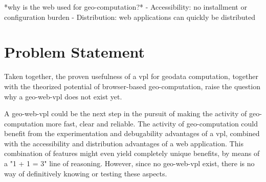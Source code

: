 







*why is the web used for geo-computation?*
- Accessibility: no installment or configuration burden
- Distribution: web applications can quickly be distributed


\section{Problem Statement}
Taken together, the proven usefulness of a vpl for geodata computation, together with the theorized potential of browser-based geo-computation, raise the question why a \ac{geo-web-vpl} does not exist yet.

A \ac{geo-web-vpl} could be the next step in the pursuit of making the activity of geo-computation more fast, clear and reliable.
The activity of geo-computation could benefit from the experimentation and debugability advantages of a \ac{vpl}, combined with the accessibility and distribution advantages of a web application. This combination of features might even yield completely unique benefits, by means of a "1 + 1 = 3" line of reasoning.
However, since no geo-web-vpl exist, there is no way of definitively knowing or testing these aspects. 

